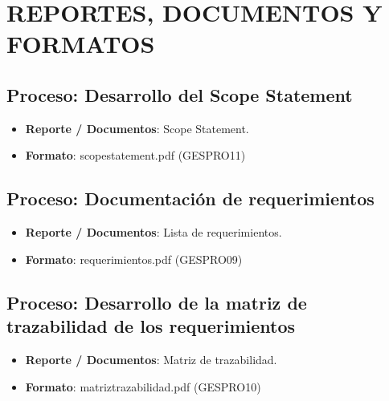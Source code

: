 \chapter{REPORTES, DOCUMENTOS Y FORMATOS}
%
\section{Proceso: Desarrollo del Scope Statement}
%
\begin{itemize}
	\item \textbf{Reporte / Documentos}: Scope Statement.
	\item \textbf{Formato}: scopestatement.pdf (GESPRO11)
\end{itemize}
%
\section{Proceso: Documentaci\'on de requerimientos}
%
\begin{itemize}
	\item \textbf{Reporte / Documentos}: Lista de requerimientos.
	\item \textbf{Formato}: requerimientos.pdf (GESPRO09)
\end{itemize}
%
\section{Proceso: Desarrollo de la matriz de trazabilidad de los requerimientos}
%
\begin{itemize}
	\item \textbf{Reporte / Documentos}: Matriz de trazabilidad.
	\item \textbf{Formato}: matriztrazabilidad.pdf (GESPRO10)
\end{itemize}